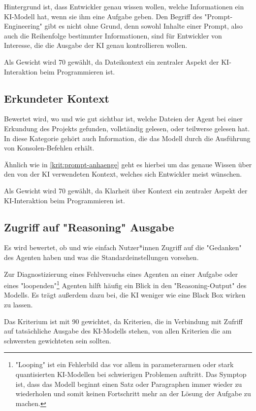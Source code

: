 \documentclass[ngerman]{seminarvorlage}
\begin{document}
Hintergrund ist, dass Entwickler genau wissen wollen, welche Informationen ein KI-Modell hat, wenn sie ihm eine Aufgabe geben. Den Begriff des "Prompt-Engineering" gibt es nicht ohne Grund, denn sowohl Inhalte einer Prompt, also auch die Reihenfolge bestimmter Informationen, sind für Entwickler von Interesse, die die Ausgabe der KI genau kontrollieren wollen.

Als Gewicht wird 70 gewählt, da Dateikontext ein zentraler Aspekt der KI-Interaktion beim Programmieren ist.

\subsection{Erkundeter Kontext}
Bewertet wird, wo und wie gut sichtbar ist, welche Dateien der Agent bei einer Erkundung des Projekts gefunden, vollständig gelesen, oder teilwerse gelesen hat. In diese Kategorie gehört auch Information, die das Modell durch die Ausführung von Konsolen-Befehlen erhält.

Ähnlich wie in \cref{krit:prompt-anhaenge} geht es hierbei um das genaue Wissen über den von der KI verwendeten Kontext, welches sich Entwickler meist wünschen.

Als Gewicht wird 70 gewählt, da Klarheit über Kontext ein zentraler Aspekt der KI-Interaktion beim Programmieren ist.

\subsection{Zugriff auf "Reasoning" Ausgabe}
Es wird bewertet, ob und wie einfach Nutzer*innen Zugriff auf die "Gedanken" des Agenten haben und was die Standardeinstellungen vorsehen.

Zur Diagnostizierung eines Fehlversuchs eines Agenten an einer Aufgabe oder eines "loopenden"\footnote{"Looping" ist ein Fehlerbild das vor allem in parameterarmen oder stark quantisierten KI-Modellen bei schwierigen Problemen auftritt. Das Symptop ist, dass das Modell beginnt einen Satz oder Paragraphen immer wieder zu wiederholen und somit keinen Fortschritt mehr an der Lösung der Aufgabe zu machen.} Agenten hilft häufig ein Blick in den "Reasoning-Output" des Modells. Es trägt außerdem dazu bei, die KI weniger wie eine Black Box wirken zu lassen.

Das Kriterium ist mit 90 gewichtet, da Kriterien, die in Verbindung mit Zufriff auf tatsächliche Ausgabe des KI-Modells stehen, von allen Kriterien die am schwersten gewichteten sein sollten.
\end{document}
